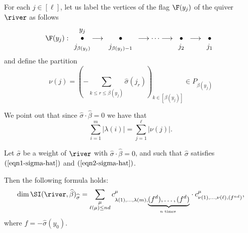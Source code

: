 For each $j \in [\ell]$, let us label the vertices of the flag $\F(y_j)$ of the quiver $\river$ as follows
$$
\F(y_j) : \begin{array}{c}y_j\\ \bullet \\ j_{\beta(y_j)} \end{array} \hspace{-6pt} \longrightarrow \begin{array}{c}\\{\bullet} \\ j_{\beta(y_j)-1} \end{array} \longrightarrow \cdots \longrightarrow \begin{array}{c}\\{\bullet} \\ j_2 \end{array}  \longrightarrow \begin{array}{c}\\{\bullet} \\ j_1 \end{array}
$$
and define the partition 
\begin{equation}\label{defn-nu-sigma-hat-eqn2}
\nu(j)=\left( -\sum_{k \leq r \leq \beta(y_j)} \widehat{\sigma}(j_r) \right)_{k \in [\beta(y_j)]} \in P_{\beta(y_j)}
\end{equation}

We point out that since $\widehat{\sigma}\cdot \widehat{\beta}=0$ we have that
$$
\sum_{i=1}^m |\lambda(i)|=\sum_{j=1}^{\ell} |\nu(j)|.
$$

\begin{prop} \label{main-compute-semi-inv-LR-prop} Let $\widehat{\sigma}$ be a weight of $\river$ with $\widehat{\sigma} \cdot \widehat{\beta}=0$, and such that $\widehat{\sigma}$ satisfies $(\ref{eqn1-sigma-hat})$ and $(\ref{eqn2-sigma-hat})$.  

Then the following formula holds:
\begin{equation}\label{main-compute-semi-inv-LR-eqn}
\dim \SI(\river, \widehat{\beta})_{\widehat{\sigma}} = \sum_{\substack{\mu\\ \ell(\mu)\leq nd}} c^\mu_{\lambda(1),\ldots, \lambda(m), \underbrace{(f^d),\ldots, (f^d)}_{n \text{ times }}} \cdot c^\mu_{\nu(1),\ldots, \nu(\ell),(f^{nd})},
\end{equation} 
where $f=-\widehat{\sigma}(y_0)$.
\end{prop}

